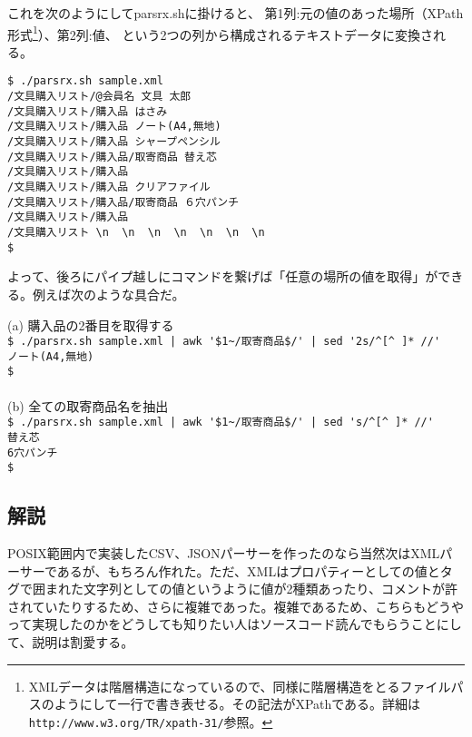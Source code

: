 これを次のようにしてparsrx.shに掛けると、
第1列:元の値のあった場所（XPath形式\footnote{XMLデータは階層構造になっているので、同様に階層構造をとるファイルパスのようにして一行で書き表せる。その記法がXPathである。詳細は\verb|http://www.w3.org/TR/xpath-31/|参照。}）、第2列:値、
という2つの列から構成されるテキストデータに変換される。
\begin{screen}
	\verb|$ ./parsrx.sh sample.xml| \return \\
	\verb|/文具購入リスト/@会員名 文具 太郎| \\
	\verb|/文具購入リスト/購入品 はさみ| \\
	\verb|/文具購入リスト/購入品 ノート(A4,無地)| \\
	\verb|/文具購入リスト/購入品 シャープペンシル| \\
	\verb|/文具購入リスト/購入品/取寄商品 替え芯| \\
	\verb|/文具購入リスト/購入品| \\
	\verb|/文具購入リスト/購入品 クリアファイル| \\
	\verb|/文具購入リスト/購入品/取寄商品 ６穴パンチ| \\
	\verb|/文具購入リスト/購入品| \\
	\verb|/文具購入リスト \n  \n  \n  \n  \n  \n  \n| \\
	\verb|$ |
\end{screen}

よって、後ろにパイプ越しにコマンドを繋げば「任意の場所の値を取得」ができる。例えば次のような具合だ。
\begin{screen}
	(a) 購入品の2番目を取得する \\
	\verb!$ ./parsrx.sh sample.xml | awk '$1~/取寄商品$/' | sed '2s/^[^ ]* //'! \return \\
	\verb|ノート(A4,無地)| \\
	\verb|$ | \\
	\\
	(b) 全ての取寄商品名を抽出 \\
	\verb!$ ./parsrx.sh sample.xml | awk '$1~/取寄商品$/' | sed 's/^[^ ]* //'! \return \\
	\verb|替え芯| \\
	\verb|6穴パンチ| \\
	\verb|$ |
\end{screen}

\subsection*{解説}

POSIX範囲内で実装したCSV、JSONパーサーを作ったのなら当然次はXMLパーサーであるが、もちろん作れた。ただ、XMLはプロパティーとしての値とタグで囲まれた文字列としての値というように値が2種類あったり、コメントが許されていたりするため、さらに複雑であった。複雑であるため、こちらもどうやって実現したのかをどうしても知りたい人はソースコード読んでもらうことにして、説明は割愛する。

